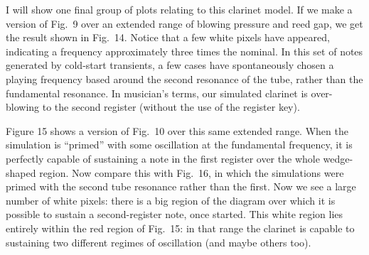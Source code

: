   I will show one final group of plots relating to this clarinet model. If we 
  make a version of Fig.\ 9 over an extended range of blowing pressure and reed 
  gap, we get the result shown in Fig.\ 14. Notice that a few white pixels have 
  appeared, indicating a frequency approximately three times the nominal. In 
  this set of notes generated by cold-start transients, a few cases have 
  spontaneously chosen a playing frequency based around the second resonance of 
  the tube, rather than the fundamental resonance. In musician's terms, our 
  simulated clarinet is over-blowing to the second register (without the use of 
  the register key). 


  Figure 15 shows a version of Fig.\ 10 over this same extended range. When the 
  simulation is “primed” with some oscillation at the fundamental frequency, it 
  is perfectly capable of sustaining a note in the first register over the 
  whole wedge-shaped region. Now compare this with Fig.\ 16, in which the 
  simulations were primed with the second tube resonance rather than the first. 
  Now we see a large number of white pixels: there is a big region of the 
  diagram over which it is possible to sustain a second-register note, once 
  started. This white region lies entirely within the red region of Fig.\ 15: 
  in that range the clarinet is capable to sustaining two different regimes of 
  oscillation (and maybe others too). 



